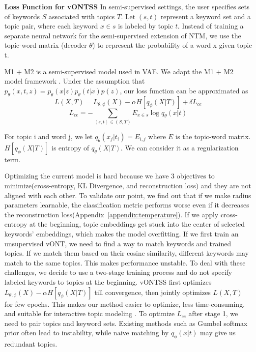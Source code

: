 \documentclass[11pt]{article}
\begin{document}
\textbf{Loss Function for vONTSS}
In semi-supervised settings, the user specifies sets of keywords $S$ associated with topics $T$. Let $(s, t)$ represent a keyword set and a topic pair, where each keyword $x \in s$ is labeled by topic $t$. Instead of training a separate neural network for the semi-supervised extension of NTM, we use the topic-word matrix (decoder $\theta$) to represent the probability of a word x given topic t. 




M1 + M2 is a semi-supervised model used in VAE. We adapt the M1 + M2 model framework \cite{kingma2014semi}. 
Under the assumption that $p_{\theta}(x, t, z) = p_{\theta}(x|z)  p_{\theta}(t|x)  p(z)$, our loss function can be approximated as \begin{equation}L(X, T) = L_{\theta, \phi}(X) - \alpha H[q_{\phi}(X|T)] + \delta L_{ce} \label{eq2} \end{equation} 
\begin{equation}L_{ce} = - \sum_{(s, t) \in (S, T)}E_{x \in s} \log q_{\theta}(x|t) \label{eq3} \end{equation} 




For topic i and word j, we let $q_{\theta}(x_{j}|t_{i}) = E_{i, j}$ where $E$ is the topic-word matrix. $ H[q_{\phi}(X|T)] $ is entropy of $q_{\theta}(X|T)$. We can consider it as a regularization term. 

Optimizing the current model is hard because we have 3 objectives to minimize(cross-entropy, KL Divergence, and reconstruction loss) and they are not aligned with each other. To validate our point, we find out that if we make radius parameters learnable, the classification metric performs worse even if it decreases the reconstruction loss(Appendix~\ref{appendix:temperature}). If we apply cross-entropy at the beginning, topic embeddings get stuck into the center of selected keywords' embeddings, which makes the model overfitting. If we first train an unsupervised vONT, we need to find a way to match keywords and trained topics. If we match them based on their cosine similarity, different keywords may match to the same topics. This makes performance unstable. 
To deal with these challenges, we decide to use a two-stage training process and do not specify labeled keywords to topics at the beginning. vONTSS first optimizes $L_{\theta, \phi}(X) - \alpha H[q_{\phi}(X|T)]$ till convergence, then jointly optimizes $L(X, T)$ for few epochs. This makes our method easier to optimize, less time-consuming, and suitable for interactive topic modeling \cite{hu2014interactive}. To optimize $L_{ce}$ after stage 1, we need to pair topics and keyword sets. Existing methods such as Gumbel softmax prior \cite{jang2016categorical} often lead to instability, while naive matching by $q_{\phi}(x|t)$ may give us redundant topics.
\end{document}
